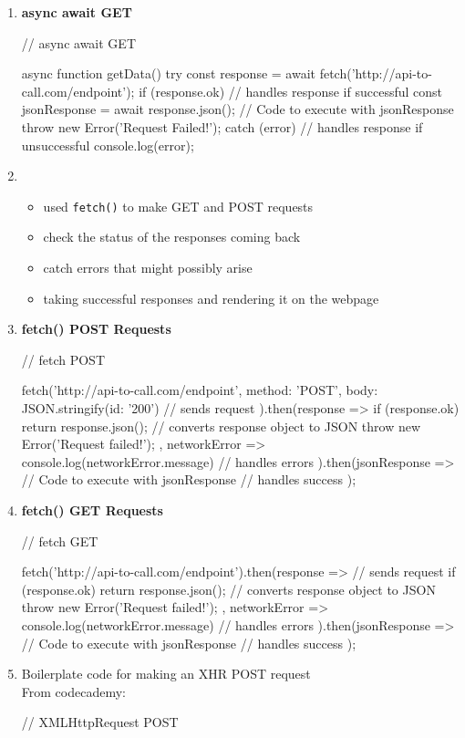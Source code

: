 \documentclass[a4paper,12pt]{article}
\begin{document}
\begin{enumerate}
\item \textbf{async await GET}
\begin{jscode}
// async await GET

async function getData(){
  try {
    const response = await fetch('http://api-to-call.com/endpoint');
    if (response.ok){ // handles response if successful
      const jsonResponse = await response.json();
      // Code to execute with jsonResponse
    }
    throw new Error('Request Failed!');
  } catch (error) { // handles response if unsuccessful
    console.log(error);
  }
}
\end{jscode}

\item 
\begin{itemize}
\item used \verb|fetch()| to make GET and POST requests
\item check the status of the responses coming back
\item catch errors that might possibly arise
\item taking successful responses and rendering it on the webpage
\end{itemize}

\item \textbf{fetch() POST Requests}
\begin{jscode}
// fetch POST

fetch('http://api-to-call.com/endpoint', {
  method: 'POST',
  body: JSON.stringify({id: '200'}) // sends request
}).then(response => {
  if (response.ok){
    return response.json(); // converts response object to JSON
  }
  throw new Error('Request failed!');
}, networkError => console.log(networkError.message) // handles errors
).then(jsonResponse => {
  // Code to execute with jsonResponse // handles success
});
\end{jscode}

\item \textbf{fetch() GET Requests}
\begin{jscode}
// fetch GET

fetch('http://api-to-call.com/endpoint').then(response => { // sends request
  if (response.ok){
    return response.json(); // converts response object to JSON
  }
  throw new Error('Request failed!');
}, networkError => console.log(networkError.message) // handles errors
).then(jsonResponse => {
  // Code to execute with jsonResponse // handles success
});
\end{jscode}

\item Boilerplate code for making an XHR POST request\\
From codecademy:
\begin{jscode}
// XMLHttpRequest POST


\end{jscode}
\end{enumerate}
\end{document}
